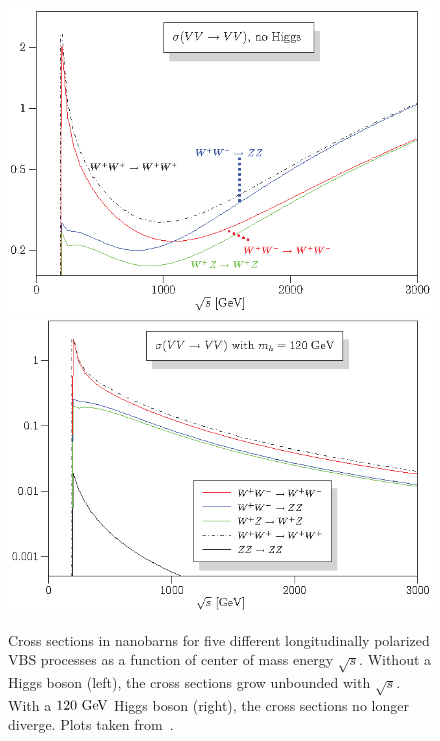 \begin{figure}[htbp]
  \centering
  \includegraphics[height=.25\textheight]{figs/ssww_13tev/introduction/vbs_xsec_nohiggs}
  \includegraphics[height=.25\textheight]{figs/ssww_13tev/introduction/vbs_xsec_higgs120}
 
  \caption[Cross sections in nanobarns for five different longitudinally polarized VBS processes as a function of center of mass energy $\sqrt{s}$.  Without a Higgs boson (left), the cross sections grow unbounded with $\sqrt{s}$. With a $120\gev$ Higgs boson (right), the cross sections no longer diverge.]{Cross sections in nanobarns for five different longitudinally polarized VBS processes as a function of center of mass energy $\sqrt{s}$.  Without a Higgs boson (left), the cross sections grow unbounded with $\sqrt{s}$. With a $120\gev$ Higgs boson (right), the cross sections no longer diverge.  Plots taken from~\cite{2008.vbs-resonances-unitarity}.}
  \label{fig:theory_vbs_xsec_higgs}
\end{figure}
